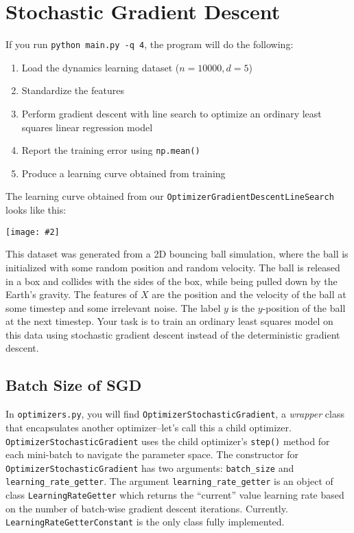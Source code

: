 \documentclass{article}
\newcommand{\centerfig}[2]{\begin{center}\texttt{[image: \#2]}\end{center}}
\def\enum#1{\begin{enumerate}#1\end{enumerate}}
\begin{document}
\section{Stochastic Gradient Descent}

If you run \verb|python main.py -q 4|, the program will do the following:
\enum{
	\item Load the dynamics learning dataset ($n = 10000, d = 5$)
	\item Standardize the features
	\item Perform gradient descent with line search to optimize an ordinary least squares linear regression model
	\item Report the training error using \texttt{np.mean()}
	\item Produce a learning curve obtained from training
}

The learning curve obtained from our \texttt{OptimizerGradientDescentLineSearch} looks like this:
\centerfig{.7}{../figs/gd_line_search_curve.png}

This dataset was generated from a 2D bouncing ball simulation, where the ball is initialized with some random position and random velocity. The ball is released in a box and collides with the sides of the box, while being pulled down by the Earth's gravity. The features of $X$ are the position and the velocity of the ball at some timestep and some irrelevant noise. The label $y$ is the $y$-position of the ball at the next timestep. Your task is to train an ordinary least squares model on this data using stochastic gradient descent instead of the deterministic gradient descent.

\subsection{Batch Size of SGD}

In \texttt{optimizers.py}, you will find \texttt{OptimizerStochasticGradient}, a \textit{wrapper} class that encapsulates another optimizer--let's call this a child optimizer. \texttt{OptimizerStochasticGradient} uses the child optimizer's \texttt{step()} method for each mini-batch to navigate the parameter space. The constructor for \texttt{OptimizerStochasticGradient} has two arguments: \texttt{batch\_size} and \texttt{learning\_rate\_getter}. The argument \texttt{learning\_rate\_getter} is an object of class \texttt{LearningRateGetter} which returns the ``current'' value learning rate based on the number of batch-wise gradient descent iterations. Currently. \texttt{LearningRateGetterConstant} is the only class fully implemented.
\end{document}
